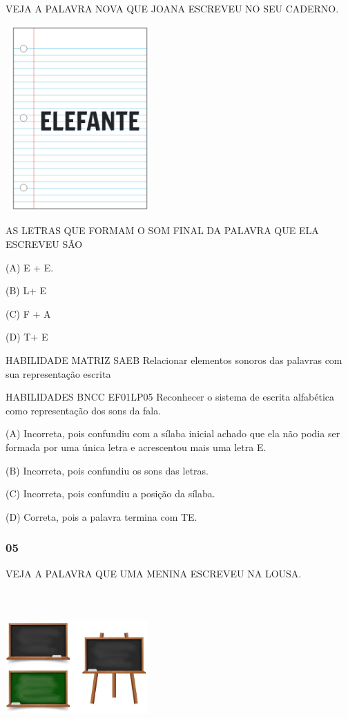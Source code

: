 \begin{escola}
VEJA A PALAVRA NOVA QUE JOANA ESCREVEU NO SEU CADERNO.

\includegraphics[width=2.24931in,height=2.80435in]{media/image230.png}

AS LETRAS QUE FORMAM O SOM FINAL DA PALAVRA QUE ELA ESCREVEU SÃO

(A) E + E.

(B) L+ E

(C) F + A

(D) T+ E

HABILIDADE MATRIZ SAEB Relacionar elementos sonoros das palavras com sua
representação escrita

HABILIDADES BNCC EF01LP05 Reconhecer o sistema de escrita alfabética
como representação dos sons da fala.

(A) Incorreta, pois confundiu com a sílaba inicial achado que ela não
podia ser formada por uma única letra e acrescentou mais uma letra E.

(B) Incorreta, pois confundiu os sons das letras.

(C) Incorreta, pois confundiu a posição da sílaba.

(D) Correta, pois a palavra termina com TE.

\subsubsection{05}\label{section-61}

VEJA A PALAVRA QUE UMA MENINA ESCREVEU NA LOUSA.

\includegraphics[width=2.13044in,height=2.33234in]{media/image231.jpg}


\end{escola}
